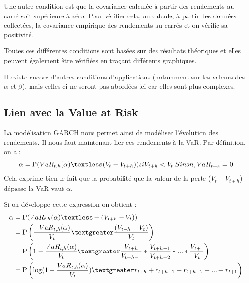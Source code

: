 			Une autre condition est que la covariance calculée à partir des rendements au carré soit supérieure à zéro.
			Pour vérifier cela, on calcule, à partir des données collectées, la covariance empirique des rendements au carrés et on vérifie sa positivité.

			Toutes ces différentes conditions sont basées sur des résultats théoriques et elles peuvent également être vérifiées en traçant différents graphiques.

			Il existe encore d'autres conditions d'applications (notamment sur les valeurs des $\alpha$ et $\beta$), mais celles-ci ne seront pas abordées ici car elles sont plus complexes.


		\subsection{Lien avec la Value at Risk}
			La modélisation GARCH nous permet ainsi de modéliser l'évolution des rendements. Il nous faut maintenant lier ces rendements à la VaR.
			Par définition, on a :
			\[\alpha = \mathrm{P}(VaR_{t,h}(\alpha)\textless (V_t - V_{t+h})) si V_{t+h} < V_t. Sinon, VaR_{t+h} = 0\]
			Cela exprime bien le fait que la probabilité que la valeur de la perte ($V_t - V_{t+h}$) dépasse la VaR vaut $\alpha$.
			
			Si on développe cette expression on obtient : 
\begin{align}
\alpha &= \mathrm{P}(VaR_{t,h}(\alpha)\textless -(V_{t+h} - V_t))\\
			&= \mathrm{P}\left(\frac{-VaR_{t,h}(\alpha)}{V_t}\textgreater\frac{(V_{t+h} - V_t)}{V_t}\right)\\
			&= \mathrm{P}\left(1-\frac{VaR_{t,h}(\alpha)}{V_t}\textgreater\frac{V_{t+h}}{V_{t+h-1}}*\frac{V_{t+h-1}}{V_{t+h-2}}*...*\frac{V_{t+1}}{V_{t}}\right)\\
			&= \mathrm{P}\left(\log (1-\frac{VaR_{t,h}(\alpha)}{V_t})\textgreater r_{t+h}+r_{t+h-1}+r_{t+h-2}+...+r_{t+1}\right)
\end{align}

